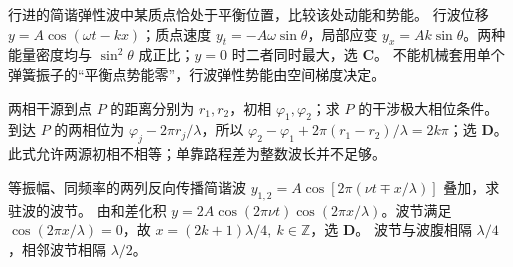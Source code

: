 \problemtext 行进的简谐弹性波中某质点恰处于平衡位置，比较该处动能和势能。
\workings 行波位移 $y=A\cos(\omega t-kx)$；质点速度 $y_t=-A\omega\sin\theta$，局部应变 $y_x=Ak\sin\theta$。两种能量密度均与 $\sin^2\theta$ 成正比；$y=0$ 时二者同时最大，选 \textbf{C}。
\crosscheck 不能机械套用单个弹簧振子的“平衡点势能零”，行波弹性势能由空间梯度决定。

\problemtext 两相干源到点 $P$ 的距离分别为 $r_1,r_2$，初相 $\varphi_1,\varphi_2$；求 $P$ 的干涉极大相位条件。
\workings 到达 $P$ 的两相位为 $\varphi_j-2\pi r_j/\lambda$，所以 $\boxed{\varphi_2-\varphi_1+2\pi(r_1-r_2)/\lambda=2k\pi}$；选 \textbf{D}。
\crosscheck 此式允许两源初相不相等；单靠路程差为整数波长并不足够。

\problemtext 等振幅、同频率的两列反向传播简谐波 $y_{1,2}=A\cos[2\pi(\nu t\mp x/\lambda)]$ 叠加，求驻波的波节。
\workings 由和差化积 $y=2A\cos(2\pi\nu t)\cos(2\pi x/\lambda)$。波节满足 $\cos(2\pi x/\lambda)=0$，故 $\boxed{x=(2k+1)\lambda/4,\ k\in\mathbb Z}$，选 \textbf{D}。
\crosscheck 波节与波腹相隔 $\lambda/4$，相邻波节相隔 $\lambda/2$。
